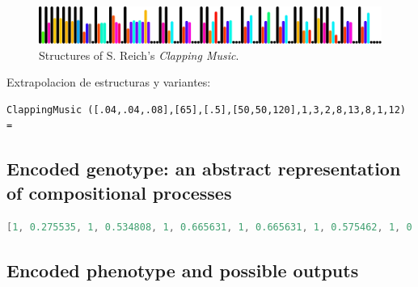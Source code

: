 \documentclass{article}
\begin{document}
\begin{figure}
\begin{center}
  \includegraphics[width=13cm]{figs/clappingVisualized.pdf}
\end{center}  
  \caption{Structures of S. Reich's \emph{Clapping Music}.}
  \label{fig:boat3}
\end{figure}




Extrapolacion de estructuras y variantes:

{\small \begin{verbatim}ClappingMusic ([.04,.04,.08],[65],[.5],[50,50,120],1,3,2,8,13,8,1,12) =\end{verbatim}}  


\subsection{Encoded genotype: an abstract representation of compositional processes}

\begin{lstlisting}[language=Java, caption=Encoded genotype for S. Reich's \emph{Clapping Music}]
[1, 0.275535, 1, 0.534808, 1, 0.665631, 1, 0.665631, 1, 0.575462, 1, 0.575462, 1, 0.606798, 1, 0.27051, 0.51, 0.5, 0, 1, 0.506578, 0.53, 0.53, 0, 1, 0.742646, 0.55, 0.51346, 0, 1, 0.36068, 0.56, 0.6, 0.56, 0.6, 0.56, 0.9, 0.56, 0, 0, 0, 1, 0.534808, 1, 0.304952, 0.57, 0, 0, 1, 0.416408, 0.58, 0.55, 0, 0, 0, 1, 0.534808, 1, 0.304952, 0.57, 0.854102, 0, 1, 0.416408, 0.58, 0.6, 0, 0, 0, 1, 0.416408, 0.58, 0.75, 0, 0, 1, 0.416408, 0.58, 0.84, 0, 0, 1, 0.416408, 0.58, 0.75, 0, 0, 1, 0.575462, 1, 0.304952, 0.57, 0.326238, 0, 1, 0.665631, 1, 0.534808, 1, 0.304952, 0.57, 0.18034, 0, 1, 0.416408, 0.58, 0.55, 0, 0, 1, 0.416408, 0.58, 0.82, 0, 0, 0, 0]
\end{lstlisting}

\subsection{Encoded phenotype and possible outputs}
\end{document}
